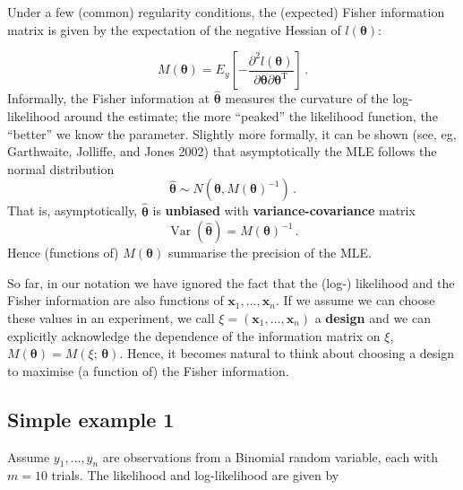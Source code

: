 \documentclass[
]{article}
\begin{document}
Under a few (common) regularity conditions, the (expected) Fisher
information matrix is given by the expectation of the negative Hessian
of \(l(\boldsymbol{\theta})\):

\[
\begin{equation}\label{eq:eFI}
M(\boldsymbol{\theta}) = E_y\left[- \frac{\partial^2 l(\boldsymbol{\theta})}{\partial\boldsymbol{\theta}\partial\boldsymbol{\theta}^\mathrm{T}}\right]\,.
\end{equation}
\] Informally, the Fisher information at \(\hat{\boldsymbol{\theta}}\)
measures the curvature of the log-likelihood around the estimate; the
more ``peaked'' the likelihood function, the ``better'' we know the
parameter. Slightly more formally, it can be shown (see, eg, Garthwaite,
Jolliffe, and Jones 2002) that asymptotically the MLE follows the normal
distribution \[
\begin{equation}\label{eq:asympNormal}
\hat{\boldsymbol{\theta}}\sim N(\boldsymbol{\theta}, M(\boldsymbol{\theta})^{-1})\,.
\end{equation}
\] That is, asymptotically, \(\hat{\boldsymbol{\theta}}\) is
\textbf{unbiased} with \textbf{variance-covariance} matrix \[
\begin{equation}\label{eq:varcov}
\operatorname{Var}(\hat{\boldsymbol{\theta}}) = M(\boldsymbol{\theta})^{-1}\,.
\end{equation}
\] Hence (functions of) \(M(\boldsymbol{\theta})\) summarise the
precision of the MLE.

So far, in our notation we have ignored the fact that the (log-)
likelihood and the Fisher information are also functions of
\(\boldsymbol{x}_{1},\ldots,\boldsymbol{x}_{n}\). If we assume we can
choose these values in an experiment, we call
\(\xi = \left(\boldsymbol{x}_{1},\ldots,\boldsymbol{x}_{n}\right)\) a
\textbf{design} and we can explicitly acknowledge the dependence of the
information matrix on \(\xi\),
\(M(\boldsymbol{\theta}) = M(\xi;\, \boldsymbol{\theta})\). Hence, it
becomes natural to think about choosing a design to maximise (a function
of) the Fisher information.

\hypertarget{simple-example-1}{%
\subsection{Simple example 1}\label{simple-example-1}}

Assume \(y_1,\ldots, y_n\) are observations from a Binomial random
variable, each with \(m=10\) trials. The likelihood and log-likelihood
are given by
\end{document}
